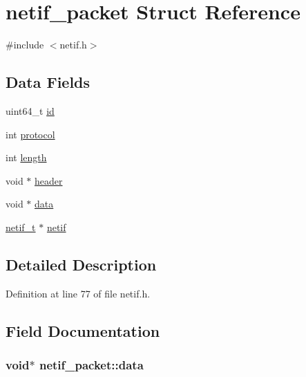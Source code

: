 \hypertarget{structnetif__packet}{\section{netif\+\_\+packet Struct Reference}
\label{structnetif__packet}
}


{\ttfamily \#include $<$netif.\+h$>$}

\subsection*{Data Fields}
\begin{DoxyCompactItemize}
\item 
uint64\+\_\+t \hyperlink{structnetif__packet_ac2dc39fe302e155960127c09161f36ae}{id}
\item 
int \hyperlink{structnetif__packet_a2517358f8125e0a674a0628a77f1095d}{protocol}
\item 
int \hyperlink{structnetif__packet_a244620016b7d377fd2558f5ccfc85d18}{length}
\item 
void $\ast$ \hyperlink{structnetif__packet_a3733c55855518d575eea678f5a2815e8}{header}
\item 
void $\ast$ \hyperlink{structnetif__packet_a3b4b8603d752944ba4360db33c5870b5}{data}
\item 
\hyperlink{netif_8h_af6c73b8fa12396c0382f58d63e895008}{netif\+\_\+t} $\ast$ \hyperlink{structnetif__packet_a3590a941c954bab54971940eeab55144}{netif}
\end{DoxyCompactItemize}


\subsection{Detailed Description}


Definition at line 77 of file netif.\+h.



\subsection{Field Documentation}
\hypertarget{structnetif__packet_a3b4b8603d752944ba4360db33c5870b5}{
\subsubsection[{data}]{\setlength{\rightskip}{0pt plus 5cm}void$\ast$ netif\+\_\+packet\+::data}}\label{structnetif__packet_a3b4b8603d752944ba4360db33c5870b5}


